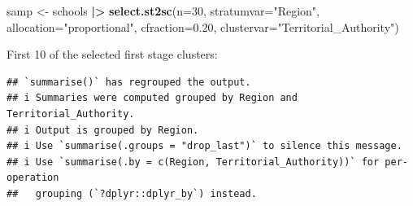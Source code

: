 \documentclass[
]{book}
\newenvironment{Shaded}{\begin{snugshade}}{\end{snugshade}}
\newcommand{\AttributeTok}[1]{\textcolor[rgb]{0.13,0.29,0.53}{#1}}
\newcommand{\ControlFlowTok}[1]{\textcolor[rgb]{0.13,0.29,0.53}{\textbf{#1}}}
\newcommand{\DecValTok}[1]{\textcolor[rgb]{0.00,0.00,0.81}{#1}}
\newcommand{\FloatTok}[1]{\textcolor[rgb]{0.00,0.00,0.81}{#1}}
\newcommand{\FunctionTok}[1]{\textcolor[rgb]{0.13,0.29,0.53}{\textbf{#1}}}
\newcommand{\NormalTok}[1]{#1}
\newcommand{\OtherTok}[1]{\textcolor[rgb]{0.56,0.35,0.01}{#1}}
\newcommand{\SpecialCharTok}[1]{\textcolor[rgb]{0.81,0.36,0.00}{\textbf{#1}}}
\newcommand{\StringTok}[1]{\textcolor[rgb]{0.31,0.60,0.02}{#1}}
\begin{document}
\begin{Shaded}
\end{Shaded}

\begin{Shaded}
\begin{Highlighting}[]
\NormalTok{samp }\OtherTok{\textless{}{-}}\NormalTok{ schools }\SpecialCharTok{|\textgreater{}} \FunctionTok{select.st2sc}\NormalTok{(}\AttributeTok{n=}\DecValTok{30}\NormalTok{, }\AttributeTok{stratumvar=}\StringTok{"Region"}\NormalTok{, }\AttributeTok{allocation=}\StringTok{"proportional"}\NormalTok{,}
                                \AttributeTok{cfraction=}\FloatTok{0.20}\NormalTok{, }\AttributeTok{clustervar=}\StringTok{"Territorial\_Authority"}\NormalTok{)}
\end{Highlighting}
\end{Shaded}

First 10 of the selected first stage clusters:

\begin{verbatim}
## `summarise()` has regrouped the output.
## i Summaries were computed grouped by Region and Territorial_Authority.
## i Output is grouped by Region.
## i Use `summarise(.groups = "drop_last")` to silence this message.
## i Use `summarise(.by = c(Region, Territorial_Authority))` for per-operation
##   grouping (`?dplyr::dplyr_by`) instead.
\end{verbatim}
\end{document}
